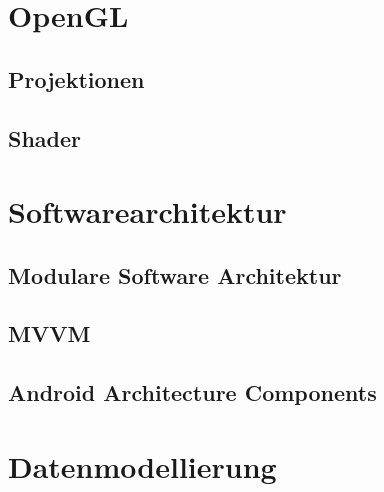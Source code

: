 
\section{OpenGL}
\label{chap:OpenGL}
\subsection{Projektionen}
\subsection{Shader}

\section{Softwarearchitektur}
\label{chap:Softwarearchitektur}
\subsection{Modulare Software Architektur}
\label{chap:Modulare Software Architektur}
\subsection{MVVM}
\subsection{Android Architecture Components}
\label{chap:AAC}



\section{Datenmodellierung}
\label{chap:Datenmodellierung}